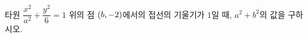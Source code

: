 타원 $\dfrac{x^2}{a^2}+\dfrac{y^2}{6}=1$ 위의 점 $(b{,}\mkern3mu\mathopen{}-2)$에서의 접선의 기울기가 $1$일 때, $a^2+b^2$의 값을 구하시오. 
